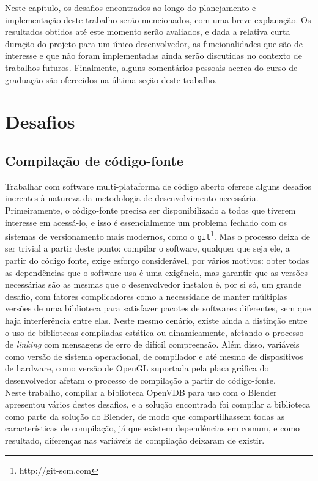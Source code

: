 
Neste capítulo, os desafios encontrados ao longo do planejamento e implementação deste trabalho serão mencionados, com uma breve explanação. Os resultados obtidos até este momento serão avaliados, e dada a relativa curta duração do projeto para um único desenvolvedor, as funcionalidades que são de interesse e que não foram implementadas ainda serão discutidas no contexto de trabalhos futuros. Finalmente, alguns comentários pessoais acerca do curso de graduação são oferecidos na última seção deste trabalho.

\section{Desafios}

\subsection*{Compilação de código-fonte}

Trabalhar com software multi-plataforma de código aberto oferece alguns desafios inerentes à natureza da metodologia de desenvolvimento necessária. Primeiramente, o código-fonte precisa ser disponibilizado a todos que tiverem interesse em acessá-lo, e isso é essencialmente um problema fechado com os sistemas de versionamento mais modernos, como o \texttt{git}\footnote{http://git-scm.com}. Mas o processo deixa de ser trivial a partir deste ponto: compilar o software, qualquer que seja ele, a partir do código fonte, exige esforço considerável, por vários motivos: obter todas as dependências que o software usa é uma exigência, mas garantir que as versões necessárias são as mesmas que o desenvolvedor instalou é, por si só, um grande desafio, com fatores complicadores como a necessidade de manter múltiplas versões de uma biblioteca para satisfazer pacotes de softwares diferentes, sem que haja interferência entre elas. Neste mesmo cenário, existe ainda a distinção entre o uso de bibliotecas compiladas estática ou dinamicamente, afetando o processo de {\it linking} com mensagens de erro de difícil compreensão. Além disso, variáveis como versão de sistema operacional, de compilador e até mesmo de dispositivos de hardware, como versão de OpenGL suportada pela placa gráfica do desenvolvedor afetam o processo de compilação a partir do código-fonte.\\

Neste trabalho, compilar a biblioteca OpenVDB para uso com o Blender apresentou vários destes desafios, e a solução encontrada foi compilar a biblioteca como parte da solução do Blender, de modo que compartilhassem todas as características de compilação, já que existem dependências em comum, e como resultado, diferenças nas variáveis de compilação deixaram de existir. 


